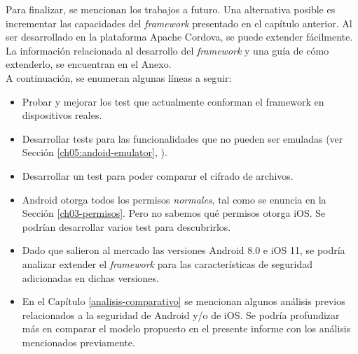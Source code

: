 Para finalizar, se mencionan los trabajos a futuro. Una alternativa posible es incrementar las capacidades del \emph{framework} presentado en el capítulo anterior. Al ser desarrollado en la plataforma Apache Cordova, se puede extender fácilmente. La información relacionada al desarrollo del \emph{framework} y una guía de cómo extenderlo, se encuentran en el Anexo.\\

A continuación, se enumeran algunas líneas a seguir:
\begin{itemize}
    \item Probar y mejorar los test que actualmente conforman el framework en dispositivos reales.
    \item Desarrollar tests para las funcionalidades que no pueden ser emuladas (ver Sección \ref{ch05:andoid-emulator}, \cite{foda, foda2}).
    \item Desarrollar un test para poder comparar el cifrado de archivos.
    \item Android otorga todos los permisos \emph{normales}, tal como se enuncia en la Sección \ref{ch03-permisos}. Pero no sabemos qué permisos otorga iOS. Se podrían desarrollar varios test para descubrirlos.
    \item Dado que salieron al mercado las versiones Android 8.0 e iOS 11, se podría analizar extender el \emph{framework} para las características de seguridad adicionadas en dichas versiones.
    \item En el Capítulo \ref{analisis-comparativo} se mencionan algunos análisis previos relacionados a la seguridad de Android y/o de iOS. Se podría profundizar más en comparar el modelo propuesto en el presente informe con los análisis mencionados previamente.
\end{itemize}